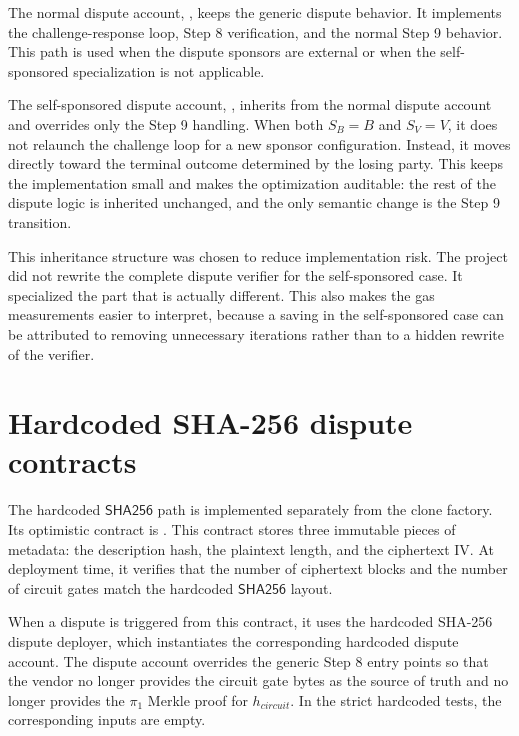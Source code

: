 The normal dispute account, , keeps the generic dispute
behavior. It implements the challenge-response loop, Step 8 verification, and the normal
Step 9 behavior. This path is used when the dispute sponsors are external or when the
self-sponsored specialization is not applicable.

The self-sponsored dispute account,
, inherits from the normal dispute account and
overrides only the Step 9 handling. When both \(S_B=B\) and \(S_V=V\), it does not relaunch
the challenge loop for a new sponsor configuration. Instead, it moves directly toward the
terminal outcome determined by the losing party. This keeps the implementation small and
makes the optimization auditable: the rest of the dispute logic is inherited unchanged, and
the only semantic change is the Step 9 transition.

This inheritance structure was chosen to reduce implementation risk. The project did not
rewrite the complete dispute verifier for the self-sponsored case. It specialized the part
that is actually different. This also makes the gas measurements easier to interpret,
because a saving in the self-sponsored case can be attributed to removing unnecessary
iterations rather than to a hidden rewrite of the verifier.

\section{Hardcoded SHA-256 dispute contracts}

The hardcoded \(\mathsf{SHA256}\) path is implemented separately from the clone factory. Its
optimistic contract is . This contract stores
three immutable pieces of metadata: the description hash, the plaintext length, and the
ciphertext IV. At deployment time, it verifies that the number of ciphertext blocks and the
number of circuit gates match the hardcoded \(\mathsf{SHA256}\) layout.

When a dispute is triggered from this contract, it uses the hardcoded SHA-256 dispute
deployer, which instantiates the corresponding hardcoded dispute account. The dispute
account overrides the generic Step 8 entry points so that the vendor no longer provides the
circuit gate bytes as the source of truth and no longer provides the \(\pi_1\) Merkle proof
for \(h_{\mathit{circuit}}\). In the strict hardcoded tests, the corresponding inputs are
empty.

